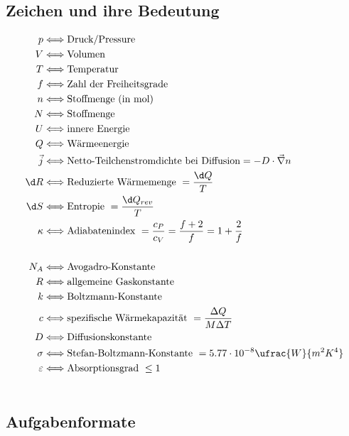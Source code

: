 \documentclass[twocolumn]{summery_3.1}
\begin{document}
\subsection{Zeichen und ihre Bedeutung}
\begin{align*}
    p &\Longleftrightarrow \text{Druck/Pressure}\\
    V &\Longleftrightarrow \text{Volumen}\\
    T &\Longleftrightarrow \text{Temperatur}\\
    f &\Longleftrightarrow \text{Zahl der Freiheitsgrade}\\
    n &\Longleftrightarrow \text{Stoffmenge (in mol)}\\
    N &\Longleftrightarrow \text{Stoffmenge}\\
    U &\Longleftrightarrow \text{innere Energie}\\
    Q &\Longleftrightarrow \text{Wärmeenergie}\\
    \vec{j} &\Longleftrightarrow \text{Netto-Teilchenstromdichte bei Diffusion} = -D\cdot \vec{\nabla}n\\
    \d R &\Longleftrightarrow \text{Reduzierte Wärmemenge} \ = \frac{\d Q}{T}\\
    \d S &\Longleftrightarrow \text{Entropie} \ = \frac{\d Q_{rev}}{T}\\
    \kappa &\Longleftrightarrow \text{Adiabatenindex} \ = \frac{c_P}{c_V} = \frac{f+2}{f}=1+\frac{2}{f}\\
    \\
    N_A &\Longleftrightarrow \text{Avogadro-Konstante}\\
    R &\Longleftrightarrow \text{allgemeine Gaskonstante}\\
    k &\Longleftrightarrow \text{Boltzmann-Konstante}\\
    c &\Longleftrightarrow \text{spezifische Wärmekapazität}\ = \frac{\Delta Q}{M\Delta T}\\
    D &\Longleftrightarrow \text{Diffusionskonstante}\\
    \sigma &\Longleftrightarrow \text{Stefan-Boltzmann-Konstante}\ = 5.77\cdot 10^{-8}\ufrac{W}{m^2K^4}\\
    \varepsilon &\Longleftrightarrow \text{Absorptionsgrad}\ \le 1\\\\
\end{align*}
\subsection{Aufgabenformate}
\end{document}
